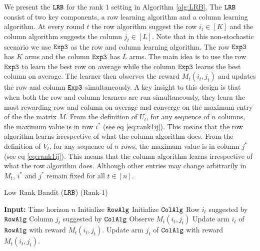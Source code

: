 We present the ${\tt LRB}$ for the rank $1$ setting in Algorithm \ref{alg:LRB}. The ${\tt LRB}$ consist of two key components, a row learning algorithm and a column learning algorithm. At every round $t$ the row algorithm suggest the row $i_t \in [K]$ and the column algorithm suggests the column $j_t\in [L]$. Note that in this non-stochastic scenario we use ${\tt Exp3}$ as the row and column learning algorithm. The row ${\tt Exp3}$ has $K$ arms and the column ${\tt Exp3}$ has $L$ arms. The main idea is to use the row ${\tt Exp3}$ to learn the best row on average while the column ${\tt Exp3}$ learns the best column on average. The learner then observes the reward $M_t(i_t, j_t)$ and updates the row and column ${\tt Exp3}$ simultaneously. A key insight to this design is that when both the row and column learners are run simultaneously, they learn the most rewarding row and column on average and converge on the maximum entry of the the matrix $M$. From the definition of $U_t$, for any sequence of $n$ columns, the maximum value is in row $i^\ast$ (see eq \eqref{eq:rank1ij}). This means that the row algorithm learns irrespective of what the column algorithm does. From the definition of $V_t$, for any sequence of $n$ rows, the maximum value is in column $j^\ast$ (see eq \eqref{eq:rank1ij}). This means that the column algorithm learns irrespective of what the row algorithm does. Although other entries may change arbitrarily in $M_t$, $i^*$ and $j^*$ remain fixed for all $t\in [n]$.
\begin{algorithm}[t]
  \caption{Low Rank Bandit (${\tt LRB}$) (Rank-$1$)}
  \label{alg:LRB}
  \begin{algorithmic}[1]
    \State \textbf{Input:} Time horizon $n$
      \State Initialize ${\tt RowAlg} $
      \State Initialize ${\tt ColAlg} $
        \State Row $i_t$ suggested by ${\tt RowAlg}$
        \State Column $j_t$ suggested by ${\tt ColAlg}$
        \State Observe $M_t(i_t, j_t)$
    \State Update arm $i_t$ of ${\tt RowAlg}$ with reward $M_t(i_t, j_t)$.
    \State Update arm $j_t$ of ${\tt ColAlg}$ with reward $M_t(i_t, j_t)$.
     \EndFor
  \end{algorithmic}
\end{algorithm}
